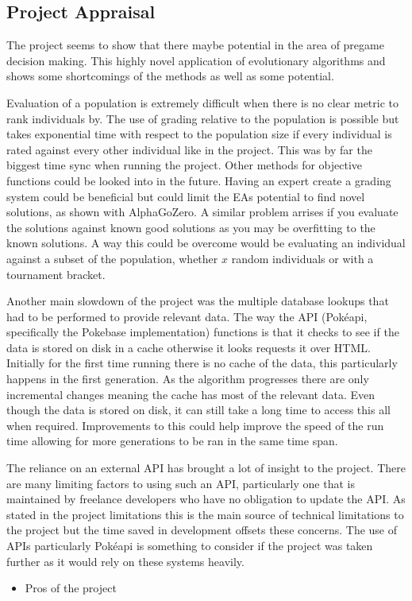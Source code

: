 \documentclass[a4paper]{article}
\newcommand{\Pokeapi}{Pok\'{e}api}
\begin{document}
\subsection{Project Appraisal}
\par
The project seems to show that there maybe potential in the area of pregame decision making.
This highly novel application of evolutionary algorithms and shows some shortcomings of the methods as well as some potential.
\par
Evaluation of a population is extremely difficult when there is no clear metric to rank individuals by.
The use of grading relative to the population is possible but takes exponential time with respect to the population size if every individual is rated against every other individual like in the project.
This was by far the biggest time sync when running the project.
Other methods for objective functions could be looked into in the future.
Having an expert create a grading system could be beneficial but could limit the EAs potential to find novel solutions, as shown with AlphaGoZero.
A similar problem arrises if you evaluate the solutions against known good solutions as you may be overfitting to the known solutions.
A way this could be overcome would be evaluating an individual against a subset of the population, whether $x$ random individuals or with a tournament bracket.
\par
Another main slowdown of the project was the multiple database lookups that had to be performed to provide relevant data.
The way the API (\Pokeapi{}, specifically the Pokebase implementation) functions is that it checks to see if the data is stored on disk in a cache otherwise it looks requests it over HTML\@.
Initially for the first time running there is no cache of the data, this particularly happens in the first generation.
As the algorithm progresses there are only incremental changes meaning the cache has most of the relevant data.
Even though the data is stored on disk, it can still take a long time to access this all when required.
Improvements to this could help improve the speed of the run time allowing for more generations to be ran in the same time span.
\par
The reliance on an external API has brought a lot of insight to the project.
There are many limiting factors to using such an API, particularly one that is maintained by freelance developers who have no obligation to update the API\@.
As stated in the project limitations this is the main source of technical limitations to the project but the time saved in development offsets these concerns.
The use of APIs particularly \Pokeapi{} is something to consider if the project was taken further as it would rely on these systems heavily.
\\ \par
\begin{itemize}
	\item Pros of the project
\end{itemize}
\end{document}

